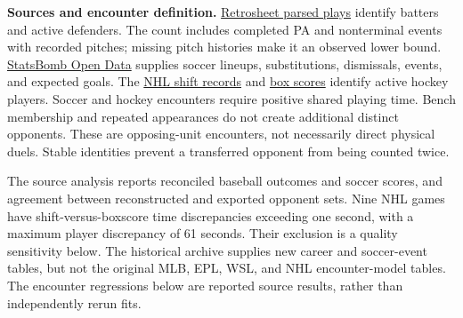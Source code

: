 \documentclass[11pt,letterpaper]{article}
\newcommand{\src}[2]{\href{#1}{#2}}
\begin{document}
\textbf{Sources and encounter definition.}
\src{https://www.retrosheet.org/downloads/plays.html}{Retrosheet parsed plays} identify batters and active defenders.
The count includes completed PA and nonterminal events with recorded pitches; missing pitch histories make it an observed lower bound.
\src{https://github.com/hudl/open-data}{StatsBomb Open Data} supplies soccer lineups, substitutions, dismissals, events, and expected goals.
The \src{https://api.nhle.com/stats/rest/en/shiftcharts?cayenneExp=gameId=2023020001}{NHL shift records} and \src{https://api-web.nhle.com/v1/gamecenter/2023020001/boxscore}{box scores} identify active hockey players.
Soccer and hockey encounters require positive shared playing time.
Bench membership and repeated appearances do not create additional distinct opponents.
These are opposing-unit encounters, not necessarily direct physical duels.
Stable identities prevent a transferred opponent from being counted twice.

The source analysis reports reconciled baseball outcomes and soccer scores, and agreement between reconstructed and exported opponent sets.
Nine NHL games have shift-versus-boxscore time discrepancies exceeding one second, with a maximum player discrepancy of 61 seconds.
Their exclusion is a quality sensitivity below.
The historical archive supplies new career and soccer-event tables, but not the original MLB, EPL, WSL, and NHL encounter-model tables.
The encounter regressions below are reported source results, rather than independently rerun fits.
\end{document}
